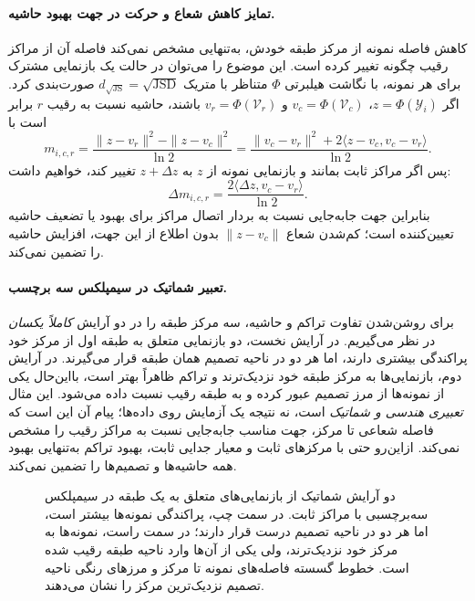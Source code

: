 \paragraph{تمایز کاهش شعاع و حرکت در جهت بهبود حاشیه.}
کاهش فاصله نمونه از مرکز طبقه خودش، به‌تنهایی مشخص نمی‌کند
فاصله آن از مراکز رقیب چگونه تغییر کرده است. این موضوع را
می‌توان در حالت یک بازنمایی مشترک برای هر نمونه، با
نگاشت هیلبرتی $\Phi$ متناظر با متریک
$d_{\sqrt{\mathrm{JS}}}=\sqrt{\operatorname{JSD}}$ صورت‌بندی کرد.
اگر $z=\Phi(\mathscr Y_i)$، $v_c=\Phi(\mathcal V_c)$ و
$v_r=\Phi(\mathcal V_r)$ باشند، حاشیه نسبت به رقیب $r$
برابر است با
\begin{equation}\label{cmp:eq:ch3-fixed-center-pairwise-js-margin}
m_{i,c,r}
=\frac{\|z-v_r\|^2-\|z-v_c\|^2}{\ln2}
=\frac{\|v_c-v_r\|^2+2\langle z-v_c,v_c-v_r\rangle}{\ln2}.
\end{equation}
پس اگر مراکز ثابت بمانند و بازنمایی نمونه از $z$ به
$z+\Delta z$ تغییر کند، خواهیم داشت:
\begin{equation}\label{cmp:eq:ch3-fixed-center-pairwise-js-change}
\Delta m_{i,c,r}
=\frac{2\langle\Delta z,v_c-v_r\rangle}{\ln2}.
\end{equation}
بنابراین جهت جابه‌جایی نسبت به بردار اتصال مراکز برای
بهبود یا تضعیف حاشیه تعیین‌کننده است؛ کم‌شدن شعاع
$\|z-v_c\|$ بدون اطلاع از این جهت، افزایش حاشیه را
تضمین نمی‌کند.


\paragraph{تعبیر شماتیک در سیمپلکس سه برچسب.}
برای روشن‌شدن تفاوت تراکم و حاشیه،
سه مرکز طبقه را در دو آرایش
\emph{کاملاً یکسان} در نظر می‌گیریم.
در آرایش نخست، دو بازنمایی
متعلق به طبقه اول از مرکز
خود پراکندگی بیشتری دارند،
اما هر دو در ناحیه تصمیم
همان طبقه قرار می‌گیرند.
در آرایش دوم، بازنمایی‌ها
به مرکز طبقه خود نزدیک‌ترند
و تراکم ظاهراً بهتر است،
بااین‌حال یکی از نمونه‌ها
از مرز تصمیم عبور کرده و
به طبقه رقیب نسبت داده
می‌شود. این مثال
\emph{تعبیری هندسی و شماتیک}
است، نه نتیجه یک آزمایش
روی داده‌ها؛ پیام آن
این است که فاصله
شعاعی تا مرکز،
جهت مناسب جابه‌جایی
نسبت به مراکز رقیب
را مشخص نمی‌کند.
ازاین‌رو حتی با
مرکزهای ثابت و
معیار جدایی ثابت،
بهبود تراکم به‌تنهایی
بهبود همه حاشیه‌ها
و تصمیم‌ها را
تضمین نمی‌کند.

\begin{figure}[htbp]
\centering
\resizebox{0.98\linewidth}{!}{%
%
}
\caption{دو آرایش شماتیک از بازنمایی‌های متعلق به یک طبقه در سیمپلکس سه‌برچسبی با مراکز ثابت. در سمت چپ، پراکندگی نمونه‌ها بیشتر است، اما هر دو در ناحیه تصمیم درست قرار دارند؛ در سمت راست، نمونه‌ها به مرکز خود نزدیک‌ترند، ولی یکی از آن‌ها وارد ناحیه طبقه رقیب شده است. خطوط گسسته فاصله‌های نمونه تا مرکز و مرزهای رنگی ناحیه تصمیم نزدیک‌ترین مرکز را نشان می‌دهند.}
\label{cmp:fig:ch3-margin-vs-compactness}
\end{figure}

